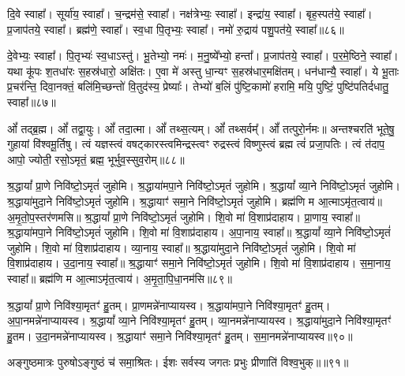 दि॒वे स्वाहा᳚। 
सूर्या॑य॒ स्वाहा᳚। 
च॒न्द्रम॑से॒ स्वाहा᳚। 
नक्ष॑त्रेभ्यः॒ स्वाहा᳚। 
इन्द्रा॑य॒ स्वाहा᳚। 
बृह॒स्पत॑ये॒ स्वाहा᳚। 
प्र॒जाप॑तये॒ स्वाहा᳚। 
ब्रह्म॑णे॒ स्वाहा᳚। 
स्व॒धा पि॒तृभ्यः॒ स्वाहा᳚। 
नमो॑ रु॒द्राय॑ पशु॒पत॑ये॒ स्वाहा᳚॥८६॥

दे॒वेभ्यः॒ स्वाहा᳚। 
पि॒तृभ्यः॑ स्व॒धाऽस्तु॑। 
भू॒तेभ्यो॒ नमः॑। 
म॒नु॒ष्ये᳚भ्यो॒ हन्ता᳚। 
प्र॒जाप॑तये॒ स्वाहा᳚। 
प॒र॒मे॒ष्ठिने॒ स्वाहा᳚। 
यथा कू॑पः श॒तधा॑रः स॒हस्र॑धारो॒ अक्षि॑तः। 
ए॒वा मे॑ अस्तु धा॒न्यꣳ स॒हस्र॑धार॒मक्षि॑तम्। 
धन॑धान्यै॒ स्वाहा᳚। 
ये भू॒ताः प्र॒चर॑न्ति॒ दिवा॒नक्तं॒ बलि॑मि॒च्छन्तो॑ वि॒तुद॑स्य॒ प्रेष्याः᳚। 
तेभ्यो॑ ब॒लिं पु॑ष्टि॒कामो॑ हरामि॒ मयि॒ पुष्टिं॒ पुष्टि॑पतिर्दधातु॒ स्वाहा᳚॥८७॥ 
\anuvakamend

ओं᳚ तद्ब्र॒ह्म। 
ओं᳚ तद्वा॒युः। 
ओं᳚ तदा॒त्मा। 
ओं᳚ तथ्स॒त्यम्‌।
ओं᳚ तथ्सर्वम्᳚‌। 
ओं᳚ तत्पुरो॒र्नमः॥
अन्तश्चरति॑ भूते॒षु॒ गुहायां वि॑श्वमू॒र्तिषु।
त्वं यज्ञस्त्वं वषट्कारस्त्वमिन्द्रस्त्वꣳ रुद्रस्त्वं विष्णुस्त्वं ब्रह्म त्वं॑ प्रजा॒पतिः।
त्वं त॑दाप॒ आपो॒ ज्योती॒ रसो॒ऽमृतं॒ ब्रह्म॒ भूर्भुव॒स्सुव॒रोम्‌॥८८॥
\anuvakamend

श्र॒द्धायां᳚ प्रा॒णे निवि॑ष्टो॒\-ऽ\-मृतं॑ जुहोमि। 
श्र॒द्धाया॑\-मपा॒ने निवि॑ष्टो॒\-ऽ\-मृतं॑ जुहोमि। 
श्र॒द्धायां᳚ व्या॒ने निवि॑ष्टो॒\-ऽ\-मृतं॑ जुहोमि। 
श्र॒द्धाया॑\-मुदा॒ने निवि॑ष्टो॒\-ऽ\-मृतं॑ जुहोमि। 
श्र॒द्धायाꣳ॑ समा॒ने निवि॑ष्टो॒\-ऽ\-मृतं॑ जुहोमि। 
ब्रह्म॑णि म आ॒त्माऽमृ॑त॒त्वाय॑॥ 
अ॒मृ॒तो॒प॒स्तर॑णमसि॥ 
श्र॒द्धायां᳚ प्रा॒णे निवि॑ष्टो॒\-ऽ\-मृतं॑ जुहोमि। 
शि॒वो मा॑ वि॒शाप्र॑दाहाय। 
प्रा॒णाय॒ स्वाहा᳚॥ 
श्र॒द्धाया॑\-मपा॒ने निवि॑ष्टो॒\-ऽ\-मृतं॑ जुहोमि। 
शि॒वो मा॑ वि॒शाप्र॑दाहाय। 
अ॒पा॒नाय॒ स्वाहा᳚॥ 
श्र॒द्धायां᳚ व्या॒ने निवि॑ष्टो॒\-ऽ\-मृतं॑ जुहोमि। 
शि॒वो मा॑ वि॒शाप्र॑दाहाय। 
व्या॒नाय॒ स्वाहा᳚॥ 
श्र॒द्धाया॑\-मुदा॒ने निवि॑ष्टो॒\-ऽ\-मृतं॑ जुहोमि। 
शि॒वो मा॑ वि॒शाप्र॑दाहाय। 
उ॒दा॒नाय॒ स्वाहा᳚॥ 
श्र॒द्धायाꣳ॑ समा॒ने निवि॑ष्टो॒\-ऽ\-मृतं॑ जुहोमि। 
शि॒वो मा॑ वि॒शाप्र॑दाहाय। 
स॒मा॒नाय॒ स्वाहा᳚॥ 
ब्रह्म॑णि म आ॒त्माऽमृ॑त॒त्वाय॑। 
अ॒मृ॒ता॒पि॒धा॒नम॑सि॥८९॥
 \anuvakamend


श्र॒द्धायां᳚ प्रा॒णे निवि॑श्या॒मृतꣳ॑ हु॒तम्। 
प्रा॒णमन्ने॑नाप्यायस्व। 
श्र॒द्धाया॑\-मपा॒ने निवि॑श्या॒मृतꣳ॑ हु॒तम्। 
अ॒पा॒नमन्ने॑नाप्यायस्व।
श्र॒द्धायां᳚ व्या॒ने निवि॑श्या॒मृतꣳ॑ हु॒तम्। 
व्या॒नमन्ने॑नाप्यायस्व। 
श्र॒द्धाया॑\-मुदा॒ने निवि॑श्या॒मृतꣳ॑ हु॒तम। 
उ॒दा॒नमन्ने॑नाप्यायस्व।
श्र॒द्धायाꣳ॑ समा॒ने निवि॑श्या॒मृतꣳ॑ हु॒तम्। 
स॒मा॒नमन्ने॑नाप्या\-यस्व॥९०॥\anuvakamend

अङ्गुष्ठमात्रः पुरुषोऽङ्गुष्ठं च॑ समा॒श्रितः। 
ईशः सर्वस्य जगतः प्रभुः प्रीणाति॑ विश्व॒भुक्॥॥९१॥\anuvakamend

